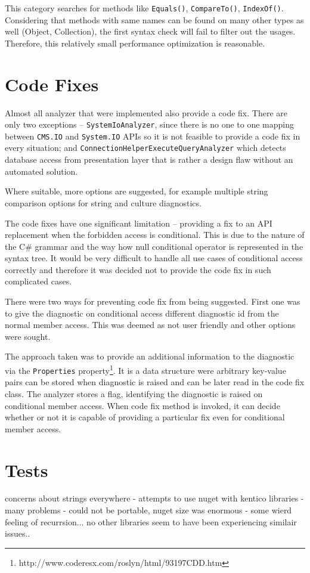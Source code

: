 \documentclass[
  digital, %
  table,   %
  lof,     %
  lot,     %
  oneside,
]{fithesis3}
\begin{document}
This category searches for methods like \texttt{Equals()}, \texttt{CompareTo()}, \texttt{IndexOf()}. Considering that methods with same names can be found on many other types as well (Object, Collection), the first syntax check will fail to filter out the usages. Therefore, this relatively small performance optimization is reasonable.

\section{Code Fixes}
Almost all analyzer that were implemented also provide a code fix. There are only two exceptions -- \texttt{SystemIoAnalyzer}, since there is no one to one mapping between \texttt{CMS.IO} and \texttt{System.IO} APIs so it is not feasible to provide a code fix in every situation; and \texttt{ConnectionHelperExecuteQueryAnalyzer} which detects database access from presentation layer that is rather a design flaw without an automated solution.

Where suitable, more options are suggested, for example multiple string comparison options for string and culture diagnostics. 

The code fixes have one significant limitation -- providing a fix to an API replacement when the forbidden access is conditional. This is due to the nature of the C\# grammar and the way how null conditional operator is represented in the syntax tree. It would be very difficult to handle all use cases of conditional access correctly and therefore it was decided not to provide the code fix in such complicated cases. 

There were two ways for preventing code fix from being suggested. First one was to give the diagnostic on conditional access different diagnostic id from the normal member access. This was deemed as not user friendly and other options were sought.

The approach taken was to provide an additional information to the diagnostic via the \texttt{Properties} property\footnote{http://www.coderesx.com/roslyn/html/93197CDD.htm}. It is a data structure were arbitrary key-value pairs can be stored when diagnostic is raised and can be later read in the code fix class. The analyzer stores a flag, identifying the diagnostic is raised on conditional member access. When code fix method is invoked, it can decide whether or not it is capable of providing a particular fix even for conditional member access.

\section{Tests}
concerns about strings everywhere - attempts to use nuget with kentico libraries - many problems - could not be portable, nuget size was enormous - some wierd feeling of recurrsion... no other libraries seem to have been experiencing similair issues..
\end{document}
